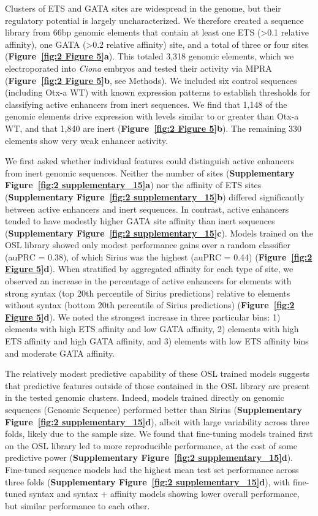 Clusters of ETS and GATA sites are widespread in the genome, but their regulatory potential is largely uncharacterized. We therefore created a sequence library from 66bp genomic elements that contain at least one ETS (>0.1 relative affinity), one GATA (>0.2 relative affinity) site, and a total of three or four sites (\textbf{Figure~\ref{fig:2 Figure 5}a}). This totaled 3,318 genomic elements, which we electroporated into \textit{Ciona} embryos and tested their activity via MPRA (\textbf{Figure~\ref{fig:2 Figure 5}b}, see Methods). We included six control sequences (including Otx-a WT) with known expression patterns to establish thresholds for classifying active enhancers from inert sequences. We find that 1,148 of the genomic elements drive expression with levels similar to or greater than Otx-a WT, and that 1,840 are inert (\textbf{Figure~\ref{fig:2 Figure 5}b}). The remaining 330 elements show very weak enhancer activity.

We first asked whether individual features could distinguish active enhancers from inert genomic sequences. Neither the number of sites (\textbf{Supplementary Figure~\ref{fig:2 supplementary_15}a}) nor the affinity of ETS sites (\textbf{Supplementary Figure~\ref{fig:2 supplementary_15}b}) differed significantly between active enhancers and inert sequences. In contrast, active enhancers tended to have modestly higher GATA site affinity than inert sequences (\textbf{Supplementary Figure~\ref{fig:2 supplementary_15}c}). Models trained on the OSL library showed only modest performance gains over a random classifier (auPRC = 0.38), of which Sirius was the highest (auPRC = 0.44) (\textbf{Figure~\ref{fig:2 Figure 5}d}). When stratified by aggregated affinity for each type of site, we observed an increase in the percentage of active enhancers for elements with strong syntax (top 20th percentile of Sirius predictions) relative to elements without syntax (bottom 20th percentile of Sirius predictions) (\textbf{Figure~\ref{fig:2 Figure 5}d}). We noted the strongest increase in three particular bins: 1) elements with high ETS affinity and low GATA affinity, 2) elements with high ETS affinity and high GATA affinity, and 3) elements with low ETS affinity bins and moderate GATA affinity.

The relatively modest predictive capability of these OSL trained models suggests that predictive features outside of those contained in the OSL library are present in the tested genomic clusters. Indeed, models trained directly on genomic sequences (Genomic Sequence) performed better than Sirius (\textbf{Supplementary Figure~\ref{fig:2 supplementary_15}d}), albeit with large variability across three folds, likely due to the sample size. We found that fine-tuning models trained first on the OSL library led to more reproducible performance, at the cost of some predictive power (\textbf{Supplementary Figure~\ref{fig:2 supplementary_15}d}). Fine-tuned sequence models had the highest mean test set performance across three folds (\textbf{Supplementary Figure~\ref{fig:2 supplementary_15}d}), with fine-tuned syntax and syntax + affinity models showing lower overall performance, but similar performance to each other.

